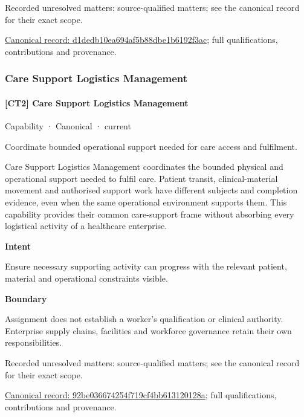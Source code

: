 {\small Recorded unresolved matters: source-qualified matters; see the canonical record for their exact scope.}\par
{\footnotesize \href{../../../../continuum/strategy/capability/d1dedb10ea694af5b88dbe1b6192f3ac.md}{Canonical record: d1dedb10ea694af5b88dbe1b6192f3ac}; full qualifications, contributions and provenance.}\par
\subsubsection{Care Support Logistics Management}

\paragraph{[CT2] Care Support Logistics Management}

\label{element:92be036674254f719cf4bb613120128a}
{\small Capability · Canonical · current}\par

Coordinate bounded operational support needed for care access and fulfilment.



Care Support Logistics Management coordinates the bounded physical and operational support needed to fulfil care. Patient transit, clinical-material movement and authorised support work have different subjects and completion evidence, even when the same operational environment supports them. This capability provides their common care-support frame without absorbing every logistical activity of a healthcare enterprise.



\textbf{Intent}



Ensure necessary supporting activity can progress with the relevant patient, material and operational constraints visible.



\textbf{Boundary}



Assignment does not establish a worker's qualification or clinical authority. Enterprise supply chains, facilities and workforce governance retain their own responsibilities.


{\small Recorded unresolved matters: source-qualified matters; see the canonical record for their exact scope.}\par
{\footnotesize \href{../../../../continuum/strategy/capability/92be036674254f719cf4bb613120128a.md}{Canonical record: 92be036674254f719cf4bb613120128a}; full qualifications, contributions and provenance.}\par
